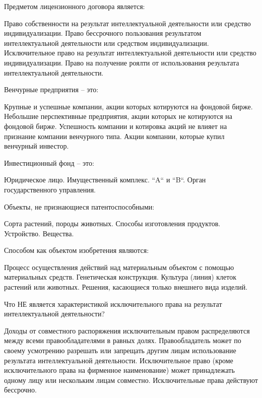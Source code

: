 \documentclass[12pt, table]{exam}
\begin{document}
\begin{questions}
\begin{multicols}{2}
\question Предметом лицензионного договора является:
\begin{choices}
	\choice Право собственности на результат интеллектуальной деятельности или средство индивидуализации.
	\choice Право бессрочного пользования результатом интеллектуальной деятельности или средством индивидуализации.
	\CC Исключительное право на результат интеллектуальной деятельности или средство индивидуализации.
	\choice Право на получение роялти от использования результата интеллектуальной деятельности.
\end{choices}

\question Венчурные предприятия – это:
\begin{choices}
	\choice Крупные и успешные компании, акции которых котируются на фондовой бирже.
	\CC Небольшие перспективные предприятия, акции которых не котируются на фондовой бирже. 
	\choice Успешность компании и котировка акций не влияет на признание компании венчурного типа.
	\choice Акции компании, которые купил венчурный инвестор.
\end{choices}

\question Инвестиционный фонд – это:
\begin{choices}
	\choice Юридическое лицо.
	\choice Имущественный комплекс.
	\CC ``A`` и ``B``. 
	\choice Орган государственного управления.
\end{choices}

\question Объекты, не признающиеся патентоспособными:
\begin{choices}
	\CC Сорта растений, породы животных. 
	\choice Способы изготовления продуктов.
	\choice Устройство.
	\choice Вещества.
\end{choices}

\question Способом как объектом изобретения являются:
\begin{choices}
	\CC Процесс осуществления действий над материальным объектом с помощью материальных средств.
	\choice Генетическая конструкция.
	\choice Культура (линия) клеток растений или животных.
	\choice Решения, касающиеся только внешнего вида изделий.
\end{choices}

\question Что НЕ является характеристикой исключительного права на результат
интеллектуальной деятельности?
\begin{choices}
	\choice Доходы от совместного распоряжения исключительным
	правом распределяются между всеми правообладателями
	в равных долях.
	\choice Правообладатель может по своему усмотрению разрешать
	или запрещать другим лицам использование результата
	интеллектуальной деятельности.
	\choice Исключительное право (кроме исключительного права на
	фирменное наименование) может принадлежать одному
	лицу или нескольким лицам совместно.
	\CC Исключительные права действуют бессрочно.
\end{choices}


\end{multicols}
\end{questions}
\end{document}
